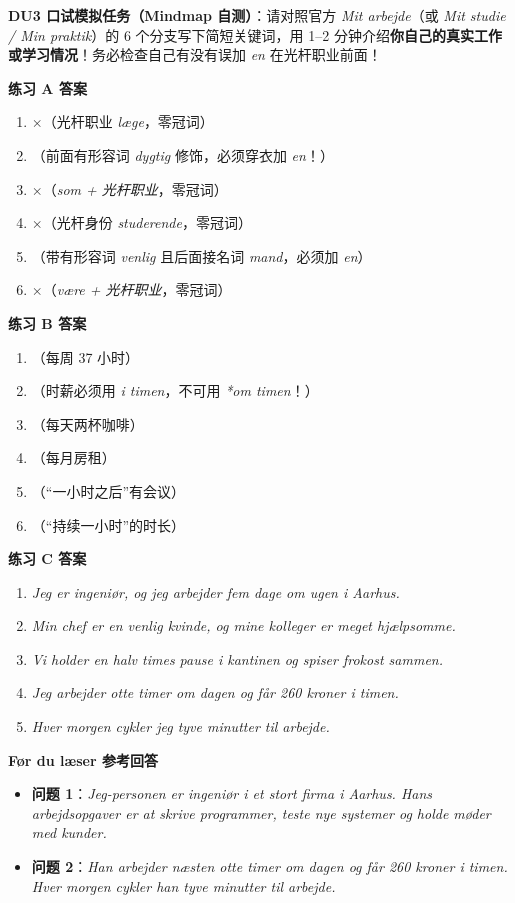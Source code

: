 
\textbf{DU3 口试模拟任务（Mindmap 自测）}：请对照官方 \textit{Mit arbejde}（或 \textit{Mit studie / Min praktik}）的 6 个分支写下简短关键词，用 1--2 分钟介绍\textbf{你自己的真实工作或学习情况}！务必检查自己有没有误加 \textit{en} 在光杆职业前面！

\begin{answerbox}
\textbf{练习 A 答案}
\begin{enumerate}
  \item $\times$（光杆职业 \textit{læge}，零冠词）
  \item {}（前面有形容词 \textit{dygtig} 修饰，必须穿衣加 \textit{en}！）
  \item $\times$（\textit{som + 光杆职业}，零冠词）
  \item $\times$（光杆身份 \textit{studerende}，零冠词）
  \item {}（带有形容词 \textit{venlig} 且后面接名词 \textit{mand}，必须加 \textit{en}）
  \item $\times$（\textit{være + 光杆职业}，零冠词）
\end{enumerate}

\textbf{练习 B 答案}
\begin{enumerate}
  \item {}（每周 37 小时）
  \item {}（时薪必须用 \textit{i timen}，不可用 \textit{*om timen}！）
  \item {}（每天两杯咖啡）
  \item {}（每月房租）
  \item {}（“一小时之后”有会议）
  \item {}（“持续一小时”的时长）
\end{enumerate}

\textbf{练习 C 答案}
\begin{enumerate}
  \item \textit{Jeg er ingeniør, og jeg arbejder fem dage om ugen i Aarhus.}
  \item \textit{Min chef er en venlig kvinde, og mine kolleger er meget hjælpsomme.}
  \item \textit{Vi holder en halv times pause i kantinen og spiser frokost sammen.}
  \item \textit{Jeg arbejder otte timer om dagen og får 260 kroner i timen.}
  \item \textit{Hver morgen cykler jeg tyve minutter til arbejde.}
\end{enumerate}

\textbf{Før du læser 参考回答}
\begin{itemize}
  \item \textbf{问题 1}：\textit{Jeg-personen er ingeniør i et stort firma i Aarhus. Hans arbejdsopgaver er at skrive programmer, teste nye systemer og holde møder med kunder.}
  \item \textbf{问题 2}：\textit{Han arbejder næsten otte timer om dagen og får 260 kroner i timen. Hver morgen cykler han tyve minutter til arbejde.}
\end{itemize}
\end{answerbox}
